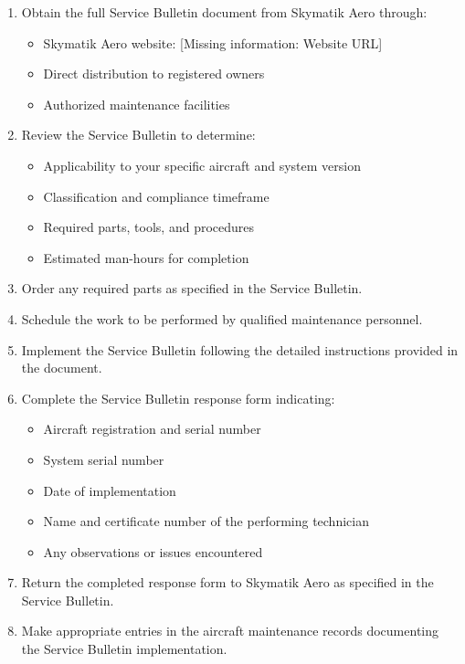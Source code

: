 \documentclass[12pt,a4paper,twoside,openright]{book}
\begin{document}
\begin{enumerate}
    \item Obtain the full Service Bulletin document from Skymatik Aero through:
    \begin{itemize}
        \item Skymatik Aero website: {\color{missingred}[Missing information: Website URL]}
        \item Direct distribution to registered owners
        \item Authorized maintenance facilities
    \end{itemize}
    
    \item Review the Service Bulletin to determine:
    \begin{itemize}
        \item Applicability to your specific aircraft and system version
        \item Classification and compliance timeframe
        \item Required parts, tools, and procedures
        \item Estimated man-hours for completion
    \end{itemize}
    
    \item Order any required parts as specified in the Service Bulletin.
    
    \item Schedule the work to be performed by qualified maintenance personnel.
    
    \item Implement the Service Bulletin following the detailed instructions provided in the document.
    
    \item Complete the Service Bulletin response form indicating:
    \begin{itemize}
        \item Aircraft registration and serial number
        \item System serial number
        \item Date of implementation
        \item Name and certificate number of the performing technician
        \item Any observations or issues encountered
    \end{itemize}
    
    \item Return the completed response form to Skymatik Aero as specified in the Service Bulletin.
    
    \item Make appropriate entries in the aircraft maintenance records documenting the Service Bulletin implementation.
\end{enumerate}
\end{document}
